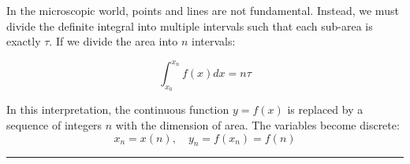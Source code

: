 \documentclass[11pt,a4paper,oneside]{article}
\newcommand{\hr}{\par\vspace{2em}\noindent\rule{\linewidth}{0.4pt}\par\vspace{2em}}
\begin{document}
In the microscopic world, points and lines are not fundamental. Instead, we must divide the definite integral into multiple intervals such that each sub-area is exactly $\tau$. If we divide the area into $n$ intervals:

\begin{equation}
    \int_{x_0}^{x_n} f(x)dx = n\tau \tag{Metron Quantization}
\end{equation}

\begin{center}
\end{center}

In this interpretation, the continuous function $y = f(x)$ is replaced by a sequence of integers $n$ with the dimension of area. The variables become discrete:
\begin{equation}
    x_n = x(n), \quad y_n = f(x_n) = f(n)
\end{equation}

\hr
\end{document}
